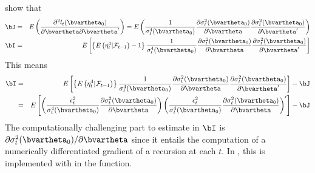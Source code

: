 \citet{FrancqThieu2018} show that
%
\begin{eqnarray}
	\bJ &=& E\left( \frac{ \partial^2 l_t(\bvartheta_0) }{ \partial\bvartheta\partial\bvartheta' } \right) = E\left( \frac{ 1 }{ \sigma_t^4(\bvartheta_0) } \frac{ \partial\sigma_t^2(\bvartheta_0) }{ \partial\bvartheta } \frac{ \partial\sigma_t^2(\bvartheta_0) }{ \partial\bvartheta' } \right) \nonumber \\
	\bI &=& E\left[ \left\{ E\left( \eta_t^4|\mathcal{F}_{t-1} \right) - 1 \right\} \frac{ 1 }{ \sigma_t^4(\bvartheta_0) } \frac{ \partial\sigma_t^2(\bvartheta_0) }{ \partial\bvartheta } \frac{ \partial\sigma_t^2(\bvartheta_0) }{ \partial\bvartheta' } \right] \nonumber
\end{eqnarray}
%
This means
%
\begin{eqnarray}
	\bI &=& E\left[ \left\{ E\left( \eta_t^4|\mathcal{F}_{t-1} \right) \right\} \frac{ 1 }{ \sigma_t^4(\bvartheta_0) } \frac{ \partial\sigma_t^2(\bvartheta_0) }{ \partial\bvartheta } \frac{ \partial\sigma_t^2(\bvartheta_0) }{ \partial\bvartheta' } \right] - \bJ \nonumber \\
	&=& E\left[ \left( \frac{ \epsilon_t^2 }{ \sigma_t^4(\bvartheta_0) } \frac{ \partial\sigma_t^2(\bvartheta_0) }{ \partial\bvartheta } \right) \left( \frac{ \epsilon_t^2 }{ \sigma_t^4(\bvartheta_0) } \frac{ \partial\sigma_t^2(\bvartheta_0) }{ \partial\bvartheta } \right)' \right] - \bJ \nonumber
\end{eqnarray}
%
The computationally challenging part to estimate in $\bI$ is $\partial\sigma_t^2(\bvartheta_0) / \partial\bvartheta $ since it entails the computation of a numerically differentiated gradient of a recursion at each $t$. In , this is implemented with  in the  function.